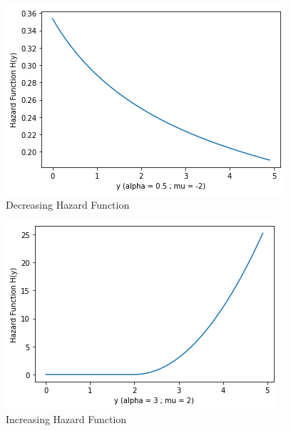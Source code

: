 \begin{figure}[h]
    \centering
    \includegraphics[width=\columnwidth-50pt]{solutions/2017/june/118/figures/Figure-1.png}
    \caption{Decreasing Hazard Function}
    \label{june/2017/118/fig:my_label1}
\end{figure}
\begin{figure}[h]
    \centering
    \includegraphics[width=\columnwidth-50pt]{solutions/2017/june/118/figures/Figure-2.png}
    \caption{Increasing Hazard Function}
    \label{june/2017/118/fig:my_label2}
\end{figure}
